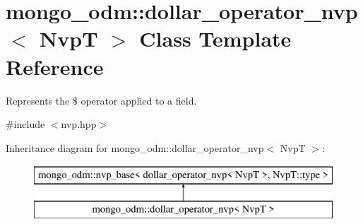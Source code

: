 \hypertarget{classmongo__odm_1_1dollar__operator__nvp}{}\section{mongo\+\_\+odm\+:\+:dollar\+\_\+operator\+\_\+nvp$<$ NvpT $>$ Class Template Reference}
\label{classmongo__odm_1_1dollar__operator__nvp}


Represents the \$ operator applied to a field.  




{\ttfamily \#include $<$nvp.\+hpp$>$}

Inheritance diagram for mongo\+\_\+odm\+:\+:dollar\+\_\+operator\+\_\+nvp$<$ NvpT $>$\+:\begin{figure}[H]
\begin{center}
\leavevmode
\includegraphics[height=2.000000cm]{classmongo__odm_1_1dollar__operator__nvp}
\end{center}
\end{figure}
